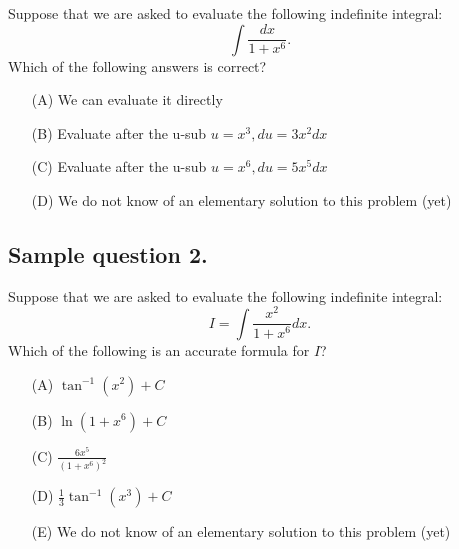 \documentclass[12pt]{article}
\begin{document}
Suppose that we are asked to evaluate the following indefinite integral:
\[
\int \frac{dx}{1+x^6}.
\]
Which of the following answers is correct?
\begin{itemize}
\item[(A)] We can evaluate it directly
\item[(B)] Evaluate after the u-sub $u=x^3, du=3x^2dx$ 
\item[(C)] Evaluate after the u-sub $u=x^6, du=5x^5dx$
\item[(D)] We do not know of an elementary solution to this problem (yet)
\end{itemize}

\subsection*{Sample question 2.}

Suppose that we are asked to evaluate the following indefinite integral:
\[
I = \int \frac{x^2}{1+x^6} dx.
\]
Which of the following is an accurate formula for $I$?
\begin{itemize}
\item[(A)] $\tan^{-1}(x^2) + C$
\item[(B)] $\ln(1+x^6) + C$ 
\item[(C)] $\frac{6x^5}{(1+x^6)^2}$
\item[(D)] $\frac{1}{3}\tan^{-1}(x^3) + C$
\item[(E)] We do not know of an elementary solution to this problem (yet)
\end{itemize}
\end{document}
